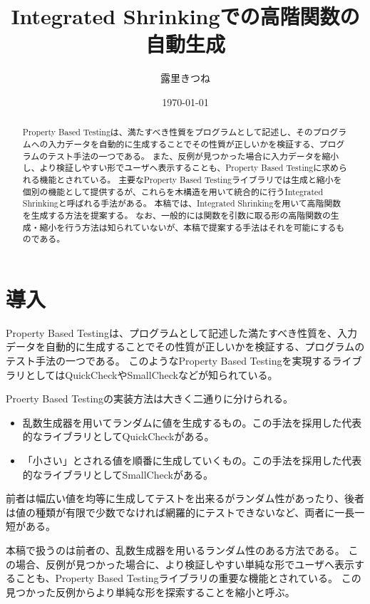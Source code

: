 \documentclass[a4paper,xelatex,ja=standard,jafont=noto]{bxjsarticle}
\title{Integrated Shrinkingでの高階関数の自動生成}
\author{露里きつね}
\date{\today}
\theoremstyle{definition}
\begin{document}
\maketitle

\begin{abstract}
  Property Based Testingは、満たすべき性質をプログラムとして記述し、そのプログラムへの入力データを自動的に生成することでその性質が正しいかを検証する、プログラムのテスト手法の一つである。
  また、反例が見つかった場合に入力データを縮小し、より検証しやすい形でユーザへ表示することも、Property Based Testingに求められる機能とされている。
  主要なProperty Based Testingライブラリでは生成と縮小を個別の機能として提供するが、これらを木構造を用いて統合的に行うIntegrated Shrinkingと呼ばれる手法がある。
  本稿では、Integrated Shrinkingを用いて高階関数を生成する方法を提案する。
  なお、一般的には関数を引数に取る形の高階関数の生成・縮小を行う方法は知られていないが、本稿で提案する手法はそれを可能にするものである。
\end{abstract}

\section{導入}

Property Based Testingは、プログラムとして記述した満たすべき性質を、入力データを自動的に生成することでその性質が正しいかを検証する、プログラムのテスト手法の一つである。
このようなProperty Based Testingを実現するライブラリとしてはQuickCheck\cite{claessen_quickcheck_2011}やSmallCheck\cite{runciman_smallcheck_2008}などが知られている。

Proerty Based Testingの実装方法は大きく二通りに分けられる。

\begin{itemize}
  \item 乱数生成器を用いてランダムに値を生成するもの。この手法を採用した代表的なライブラリとしてQuickCheckがある。
  \item 「小さい」とされる値を順番に生成していくもの。この手法を採用した代表的なライブラリとしてSmallCheckがある。
\end{itemize}

前者は幅広い値を均等に生成してテストを出来るがランダム性があったり、後者は値の種類が有限で少数でなければ網羅的にテストできないなど、両者に一長一短がある。

本稿で扱うのは前者の、乱数生成器を用いるランダム性のある方法である。
この場合、反例が見つかった場合に、より検証しやすい単純な形でユーザへ表示することも、Property Based Testingライブラリの重要な機能とされている。
この見つかった反例からより単純な形を探索することを縮小と呼ぶ。
\end{document}
